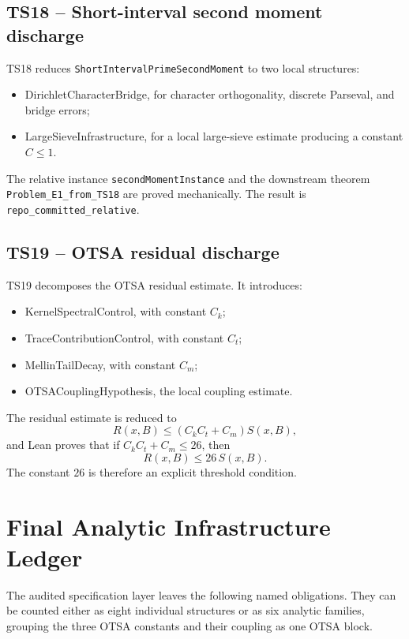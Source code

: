 \documentclass[11pt]{article}
\newcommand{\code}[1]{\texttt{#1}}
\newcommand{\status}[1]{\texttt{#1}}
\newcommand{\oblig}[1]{\textsf{#1}}
\begin{document}
\subsection{TS18 -- Short-interval second moment discharge}

TS18 reduces \code{ShortIntervalPrimeSecondMoment} to two local structures:
\begin{itemize}
  \item \oblig{DirichletCharacterBridge}, for character orthogonality,
    discrete Parseval, and bridge errors;
  \item \oblig{LargeSieveInfrastructure}, for a local large-sieve estimate
    producing a constant \(C\le 1\).
\end{itemize}
The relative instance \code{secondMomentInstance} and the downstream theorem
\code{Problem_E1_from_TS18} are proved mechanically. The result is
\status{repo_committed_relative}.

\subsection{TS19 -- OTSA residual discharge}

TS19 decomposes the OTSA residual estimate. It introduces:
\begin{itemize}
  \item \oblig{KernelSpectralControl}, with constant \(C_k\);
  \item \oblig{TraceContributionControl}, with constant \(C_t\);
  \item \oblig{MellinTailDecay}, with constant \(C_m\);
  \item \oblig{OTSACouplingHypothesis}, the local coupling estimate.
\end{itemize}
The residual estimate is reduced to
\[
  R(x,B) \le (C_k C_t + C_m) S(x,B),
\]
and Lean proves that if \(C_k C_t + C_m \le 26\), then
\[
  R(x,B) \le 26\, S(x,B).
\]
The constant \(26\) is therefore an explicit threshold condition.

\section{Final Analytic Infrastructure Ledger}

The audited specification layer leaves the following named obligations. They
can be counted either as eight individual structures or as six analytic
families, grouping the three OTSA constants and their coupling as one OTSA
block.
\end{document}
